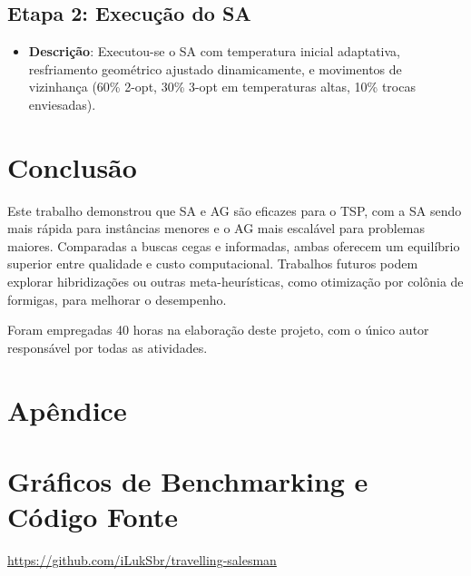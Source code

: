 \documentclass[11pt]{article}
\begin{document}
\subsection{Etapa 2: Execução do SA}
\begin{itemize}
    \item \textbf{Descrição}: Executou-se o SA com temperatura inicial adaptativa, resfriamento geométrico ajustado dinamicamente, e movimentos de vizinhança (60\% 2-opt, 30\% 3-opt em temperaturas altas, 10\% trocas enviesadas).
\end{itemize}

\section{Conclusão}
Este trabalho demonstrou que SA e AG são eficazes para o TSP, com a SA sendo mais rápida para instâncias menores e o AG mais escalável para problemas maiores. Comparadas a buscas cegas e informadas, ambas oferecem um equilíbrio superior entre qualidade e custo computacional. Trabalhos futuros podem explorar hibridizações ou outras meta-heurísticas, como otimização por colônia de formigas, para melhorar o desempenho.

Foram empregadas 40 horas na elaboração deste projeto, com o único autor responsável por todas as atividades.




\section*{Apêndice}
\appendix

\section{Gráficos de Benchmarking e Código Fonte}\label{app:code}
\href{https://github.com/iLukSbr/travelling-salesman}{https://github.com/iLukSbr/travelling-salesman}

\clearpage
\end{document}
